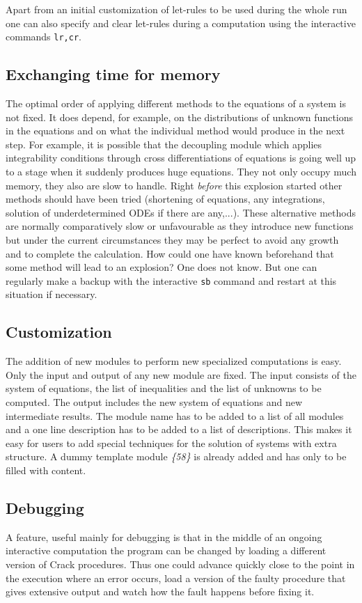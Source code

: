 \documentclass[12pt]{article}
\begin{document}
  Apart from an initial customization of let-rules to be used during the
  whole run one can also specify and clear let-rules during a
  computation using the interactive commands {\tt lr,cr}.

\subsection{Exchanging time for memory}
  The optimal order of applying different methods to the equations of a system
  is not fixed. It does depend, for example, on the distributions of
  unknown functions in the
  equations and on what the individual method would produce in the next
  step. For example, it is possible that the
  decoupling module which applies integrability conditions through cross
  differentiations of equations is going well up to a stage when it
  suddenly produces huge equations. They not only occupy much memory,
  they also are slow to handle.
  Right {\em before} this explosion started other methods should
  have been tried (shortening of equations, any integrations, solution of
  underdetermined ODEs if there are any,...). These alternative methods are normally
  comparatively slow or unfavourable as they introduce new functions but
  under the current circumstances they may be perfect to avoid any growth
  and to complete the calculation. How could one have known beforehand that some
  method will lead to an explosion? One does not know. But one can
  regularly make a backup with the interactive {\tt sb} command and
  restart at this situation if necessary.

\subsection{Customization}
  The addition of new modules to perform new specialized computations
  is easy.  Only the input and output of any new module are fixed.
  The input consists of the system of equations, the list of
  inequalities and the list of unknowns to be computed. The output
  includes the new system of equations and new intermediate
  results. The module name has to be added to a list of all modules
  and a one line description has to be added to a list of
  descriptions.  This makes it easy for users to add special
  techniques for the solution of systems with extra structure. A dummy
  template module {\em \{58\} } is already added and has only to be
  filled with content.

\subsection{Debugging}
  A feature, useful mainly for debugging is that in the middle of an
  ongoing interactive computation the program can be changed by
  loading a different version of {\sc Crack} procedures. Thus one
  could advance quickly close to the point in the execution where an
  error occurs, load a version of the faulty procedure that gives
  extensive output and watch how the fault happens before fixing it.
\end{document}
